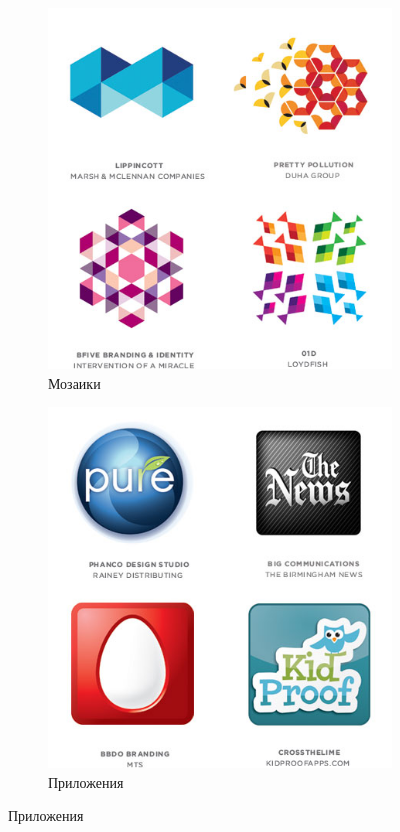\begin{figure}[h!]
  \vfill

  \centering
  \begin{subfigure}{.45\textwidth}
    \centering
    \includegraphics[width=\linewidth]{images/supplement/logolounge/2012/Mozaiki}
    \caption{Мозаики}
    \label{fig:logolounge:2012:mozaiki}
  \end{subfigure}
  \hfill
  \centering
  \begin{subfigure}{.45\textwidth}
    \centering
    \includegraphics[width=\linewidth]{images/supplement/logolounge/2012/Prilojeniya}
    \caption{Приложения}
    \label{fig:logolounge:2012:prilojeniya}
  \end{subfigure}
\end{figure}

